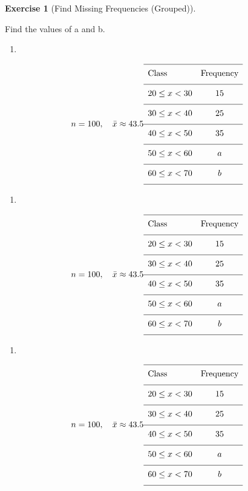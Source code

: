 \documentclass[
  letterpaper,
  DIV=11,
  numbers=noendperiod]{scrreprt}
\providecommand{\tightlist}{%
  \setlength{\itemsep}{0pt}\setlength{\parskip}{0pt}}
\theoremstyle{definition}
\newtheorem{exercise}{Exercise}[chapter]
\theoremstyle{remark}
\begin{document}
\begin{exercise}[Find Missing Frequencies
(Grouped)]\protect\hypertarget{exr-grp-6}{}\label{exr-grp-6}

Find the values of a and b.

\begin{enumerate}
\def\labelenumi{\alph{enumi})}
\tightlist
\item
\end{enumerate}

\[n = 100,\quad \bar{x} \approx 43.5\\[6pt]{\renewcommand{\arraystretch}{1.6}\begin{array}{lc}
\hline \text{Class} & \text{Frequency} \\[4pt]
\hline 20 \leq x < 30 & 15 \\[4pt]
\hline 30 \leq x < 40 & 25 \\[4pt]
\hline 40 \leq x < 50 & 35 \\[4pt]
\hline 50 \leq x < 60 & a \\[4pt]
\hline 60 \leq x < 70 & b \\[4pt]
\hline \end{array}}\]

\begin{enumerate}
\def\labelenumi{\alph{enumi})}
\setcounter{enumi}{1}
\tightlist
\item
\end{enumerate}

\[n = 100,\quad \bar{x} \approx 43.5\\[6pt]{\renewcommand{\arraystretch}{1.6}\begin{array}{lc}
\hline \text{Class} & \text{Frequency} \\[4pt]
\hline 20 \leq x < 30 & 15 \\[4pt]
\hline 30 \leq x < 40 & 25 \\[4pt]
\hline 40 \leq x < 50 & 35 \\[4pt]
\hline 50 \leq x < 60 & a \\[4pt]
\hline 60 \leq x < 70 & b \\[4pt]
\hline \end{array}}\]

\begin{enumerate}
\def\labelenumi{\alph{enumi})}
\setcounter{enumi}{2}
\tightlist
\item
\end{enumerate}

\[n = 100,\quad \bar{x} \approx 43.5\\[6pt]{\renewcommand{\arraystretch}{1.6}\begin{array}{lc}
\hline \text{Class} & \text{Frequency} \\[4pt]
\hline 20 \leq x < 30 & 15 \\[4pt]
\hline 30 \leq x < 40 & 25 \\[4pt]
\hline 40 \leq x < 50 & 35 \\[4pt]
\hline 50 \leq x < 60 & a \\[4pt]
\hline 60 \leq x < 70 & b \\[4pt]
\hline \end{array}}\]


\end{exercise}
\end{document}
